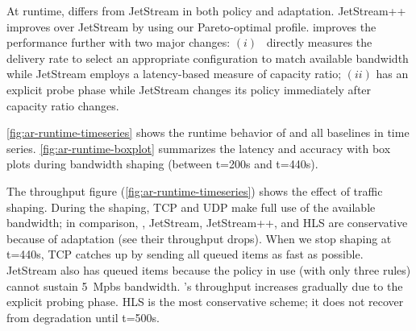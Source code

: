 At runtime, \sysname{} differs from JetStream in both policy and
adaptation. JetStream++ improves over JetStream by using our Pareto-optimal
profile. \sysname{} improves the performance further with two major changes:
$(i)$~\sysname{} directly measures the delivery rate to select an appropriate
configuration to match available bandwidth while JetStream employs a
latency-based measure of capacity ratio; $(ii)$ \sysname{} has an explicit probe
phase while JetStream changes its policy immediately after capacity ratio
changes.

 \autoref{fig:ar-runtime-timeseries} shows the runtime behavior
of \sysname{} and all baselines in time series. \autoref{fig:ar-runtime-boxplot}
summarizes the latency and accuracy with box plots during bandwidth shaping
(between t=200s and t=440s).

The throughput figure (\autoref{fig:ar-runtime-timeseries}) shows the effect of
traffic shaping. During the shaping, TCP and UDP make full use of the available
bandwidth; in comparison, \sysname{}, JetStream, JetStream++, and HLS are
conservative because of adaptation (see their throughput drops). When we stop
shaping at t=440s, TCP catches up by sending all queued items as fast as
possible. JetStream also has queued items because the policy in use (with only
three rules) cannot sustain \SI{5}{Mpbs} bandwidth. \sysname{}'s throughput
increases gradually due to the explicit probing phase. HLS is the most
conservative scheme; it does not recover from degradation until t=500s.



